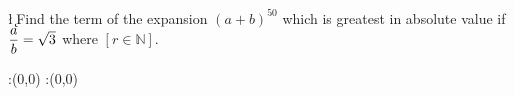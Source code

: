 


\vbtwo\l
\SUBTRACT{}\k 
\question Find the term of the expansion $(a+b)^{50}$ which is greatest in absolute value if $\dfrac{a}{b} = \sqrt{3}$ where $\left[ r \in \mathbb{N} \right]$.


\watchout

\ifprintanswers
  \begin{marginfigure}
      :(0,0)
      :(0,0)
    \figdrawbegin{}
      \figdrawline [100,101]
    \figdrawend
    \figvisu{\figBoxA}{}{%
    }
    \centerline{\box\figBoxA}
  \end{marginfigure}
\fi 

